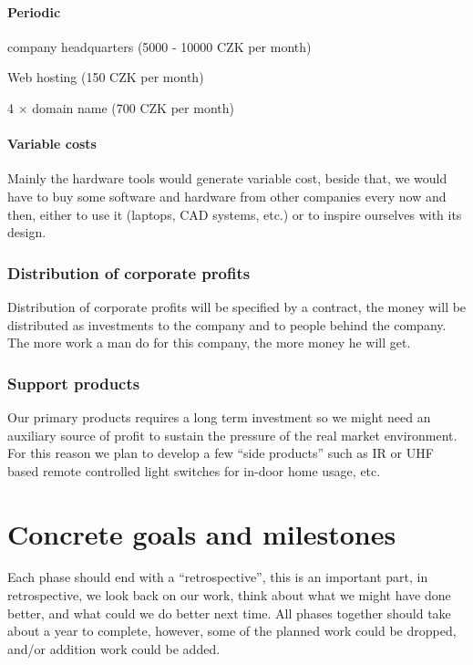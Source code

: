 \documentclass[a4paper,twoside,15pt]{book}
\begin{document}
                \subsubsection{Periodic}
                    \begin{dinglist}{73}
                        \item company headquarters (5000 - 10000 CZK per month)
                        \item Web hosting (150 CZK per month)
                        \item 4 $\times$ domain name (700 CZK per month)
                    \end{dinglist}

            \subsubsection{Variable costs}
                Mainly the hardware tools would generate variable cost, beside that, we would have to buy some software and hardware from other companies every now and then, either to use it (laptops, CAD systems, etc.) or to inspire ourselves with its design.

        \subsection{Distribution of corporate profits}
            Distribution of corporate profits will be specified by a contract, the money will be distributed as investments to the company and to people behind the company. The more work a man do for this company, the more money he will get.

        \subsection{Support products}
            Our primary products requires a long term investment so we might need an auxiliary source of profit to sustain the pressure of the real market environment. For this reason we plan to develop a few ``side products'' such as IR or UHF based remote controlled light switches for in-door home usage, etc.

\chapter{Concrete goals and milestones}
    Each phase should end with a ``retrospective'', this is an important part, in retrospective, we look back on our work, think about what we might have done better, and what could we do better next time. All phases together should take about a year to complete, however, some of the planned work could be dropped, and/or addition work could be added.
\end{document}
